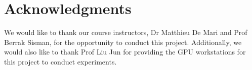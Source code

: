 \documentclass{article}
\begin{document}
\section*{Acknowledgments}
We would like to thank our course instructors, Dr Matthieu De Mari and Prof Berrak Sisman, for the opportunity to conduct this project. Additionally, we would also like to thank Prof Liu Jun for providing the GPU workstations for this project to conduct experiments.



\end{document}
